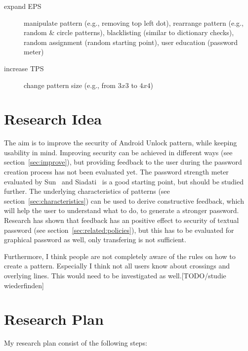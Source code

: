 \documentclass[twocolumn, a4paper, 10pt]{article}
\begin{document}
\begin{description}
	\item[expand EPS] manipulate pattern (e.g., removing top left dot), rearrange pattern (e.g., random \& circle patterns), blacklisting (similar to dictionary checks), random assignment (random starting point), user education (password meter)
	\item[increase TPS] change pattern size (e.g., from $3x3$ to $4x4$)
\end{description}

\section{Research Idea}
\label{sec:idea}
The aim is to improve the security of Android Unlock pattern, while keeping usability in mind. Improving security can be achieved in different ways (see section~\ref{sec:improve}), but providing feedback to the user during the password creation process has not been evaluated yet. The password strength meter evaluated by Sun~\cite{Sun2014308} and Siadati~\cite{siadati2015fortifying} is a good starting point, but should be studied further. The underlying characteristics of patterns (see section~\ref{sec:characteristics}) can be used to derive constructive feedback, which will help the user to understand what to do, to generate a stronger password. Research has shown that feedback has an positive effect to security of textual password (see section~\ref{sec:related:policies}), but this has to be evaluated for graphical password as well, only transfering is not sufficient.

Furthermore, I think people are not completely aware of the rules on how to create a pattern. Especially I think not all users know about crossings and overlying lines. This would need to be investigated as well.[TODO/studie wiederfinden]


\section{Research Plan}
\label{sec:plan}

My research plan consist of the following steps:\\
\end{document}
